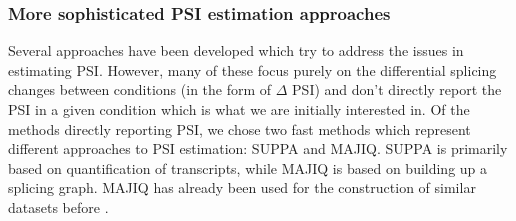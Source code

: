 



\subsubsection{More sophisticated PSI estimation approaches}

Several approaches have been developed which try to address the issues in estimating PSI. However, many of these focus purely on the differential splicing changes between conditions (in the form of $\Delta$ PSI) and don't directly report the PSI in a given condition which is what we are initially interested in. Of the methods directly reporting PSI, we chose two fast methods which represent different approaches to PSI estimation: SUPPA and MAJIQ. SUPPA is primarily based on quantification of transcripts, while MAJIQ is based on building up a splicing graph. MAJIQ has already been used for the construction of similar datasets before \cite{jha}.


